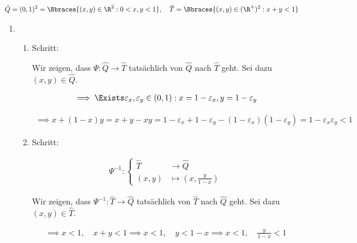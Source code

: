   \begin{solution}
  
  \begin{align*}
    \hat Q
    =
    (0, 1)^2
    =
    \Bbraces{(x, y) \in \R^2: 0 < x, y < 1},
    \quad
    \hat T
    =
    \Bbraces{(x, y) \in (\R^+)^2: x + y < 1}
  \end{align*}
  
  \begin{enumerate}[label = \textbf{\alph*)}]
  
    \item
    
    \begin{enumerate}[label = \arabic*.]
  
      \item Schritt:
  
      Wir zeigen, dass $\Psi: \hat Q \to \hat T$ tatsächlich von $\hat Q$ nach $\hat T$ geht.
      Sei dazu $(x, y) \in \hat Q$.
  
      \begin{align*}
        \implies
        \Exists \varepsilon_x, \varepsilon_y \in (0, 1):
        x = 1 - \varepsilon_x,
        y = 1 - \varepsilon_y
      \end{align*}
  
      \begin{align*}
        \implies
        x + (1 - x) y
        =
        x + y - xy
        =
        1 - \varepsilon_x + 1 - \varepsilon_y - (1 - \varepsilon_x)(1 - \varepsilon_y)
        =
        1 - \varepsilon_x \varepsilon_y
        <
        1
      \end{align*}
  
      \item Schritt:
  
      \begin{align*}
        \Psi^{-1}:
        \begin{cases}
          \hat T & \to \hat Q \\
          (x, y) & \mapsto (x, \frac{y}{1 - x})
        \end{cases}
      \end{align*}

      Wir zeigen, dass $\Psi^{-1}: \hat T \to \hat Q$ tatsächlich von $\hat T$ nach $\hat Q$ geht.
      Sei dazu $(x, y) \in \hat T$.

      \begin{align*}
        \implies
        x < 1, \quad x + y < 1
        \implies
        x < 1, \quad y < 1 - x
        \implies
        x < 1, \quad \frac{y}{1-x} < 1
      \end{align*}


\end{enumerate}
\end{enumerate}
\end{solution}
